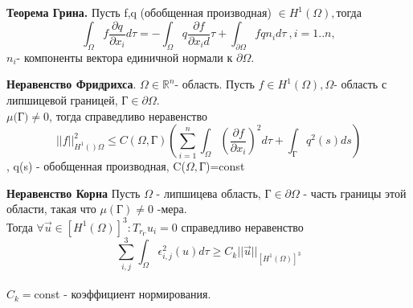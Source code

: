 \documentclass[__main__.tex]{subfiles}
\begin{document}
\begin{theorem}
	\textbf{Теорема Грина.} Пусть f,q (обобщенная производная) $\in H^{1}(\Omega),$тогда 
	$$\int_{\Omega}f\frac{\partial q}{\partial x_{i}}d\tau=-\int_{\Omega}q\frac{\partial f}{\partial x_{i}d}\tau+\int_{\partial\Omega}fq n_{i}d\tau	\ , i=1..n,$$ 
	$n_{i}$- компоненты вектора единичной нормали к $\partial\Omega$.
\end{theorem}
\begin{theorem}
\textbf{Неравенство Фридрихса}. $\Omega \in \mathbb{R}^{n}$- область. Пусть $f\in H^{1}(\Omega),\Omega$- область с липшицевой границей, Г$\in\partial\Omega$.\\
$\mu ($Г$)\neq 0$, тогда справедливо неравенство 
$$||f||^{2}_{H^{1}()\Omega}\leq C(\Omega,\textit{Г})(\sum_{i=1}^{n}\int_{\Omega}(\frac{\partial f}{\partial x_{i}})^{2}d\tau+\int_{\text{Г}}q^{2}(s)ds)$$, q(s) - обобщенная производная, C($\Omega,$Г)=const
\end{theorem}

\begin{theorem}
\textbf{Неравенство Корна} Пусть $\Omega$ - липшицева область, Г$\in\partial\Omega$ - часть границы этой области, такая что $\mu(\text{Г})\neq0$ -мера.\\
Тогда $\forall \vec{u}\in [H^{1}(\Omega)]^{3}:T_{r_{\text{Г}}}u_{i}=0$ справедливо неравенство \\
$$\sum_{i,j}^{3}\int_{\Omega}\epsilon_{i,j}^{2}(u)d\tau\geq C_{k}||\vec{u}||_{[H^{1}(\Omega)]^{3}}$$\\
$C_{k}=$const - коэффициент нормирования.
\end{theorem}
\end{document}

